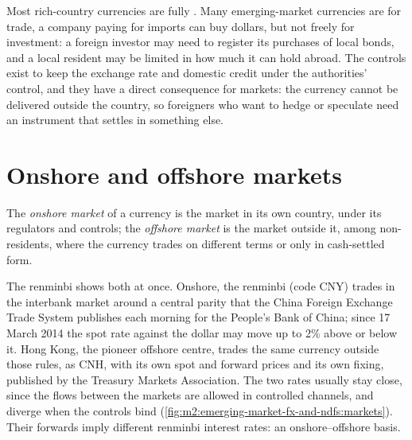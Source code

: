 Most rich-country currencies are fully . Many emerging-market
currencies are  for trade, a company paying for imports can buy
dollars, but not freely for investment: a foreign investor may need to register
its purchases of local bonds, and a local resident may be limited in how much it
can hold abroad. The controls exist to keep the exchange rate and domestic
credit under the authorities' control, and they have a direct consequence for
markets: the currency cannot be delivered outside the country, so foreigners who
want to hedge or speculate need an instrument that settles in something else.

\section{Onshore and offshore markets}

\begin{definition}\label{def:m2:emerging-market-fx-and-ndfs:onshore}
The \emph{onshore market} of a currency is the market in
its own country, under its regulators and controls; the \emph{offshore
market} is the market outside it, among non-residents,
where the currency trades on different terms or only in cash-settled form.
\end{definition}

The renminbi shows both at once. Onshore, the renminbi (code CNY) trades in the
interbank market around a central parity that the China Foreign Exchange Trade
System publishes each morning for the People's Bank of China; since 17 March
2014 the spot rate against the dollar may move up to 2\% above or below it. Hong
Kong, the pioneer offshore centre, trades the same currency outside those rules,
as CNH, with its own spot and forward prices and its own fixing, published by
the Treasury Markets Association. The two rates usually stay close, since
the flows between the markets are allowed in controlled channels, and diverge
when the controls bind (\cref{fig:m2:emerging-market-fx-and-ndfs:markets}).
Their forwards imply different renminbi interest rates: an onshore--offshore
basis.

